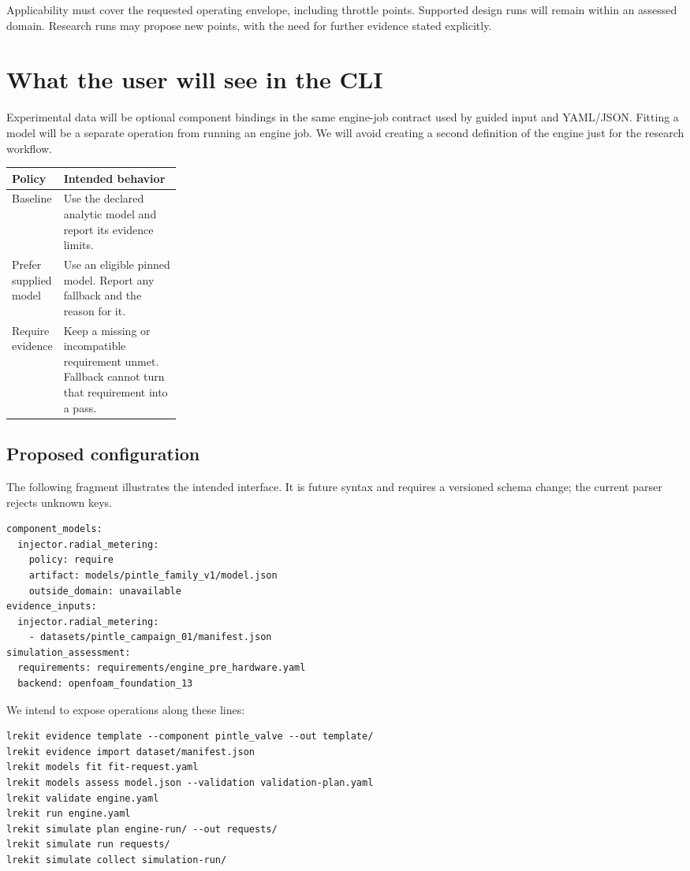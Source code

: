 Applicability must cover the requested operating envelope, including throttle points. Supported design runs will remain within an assessed domain. Research runs may propose new points, with the need for further evidence stated explicitly.

\section{What the user will see in the CLI}

Experimental data will be optional component bindings in the same engine-job contract used by guided input and YAML/JSON. Fitting a model will be a separate operation from running an engine job. We will avoid creating a second definition of the engine just for the research workflow.

\begin{tabularx}{\linewidth}{@{}P{0.25\linewidth}Y@{}}
\toprule
\textbf{Policy} & \textbf{Intended behavior}\\
\midrule
Baseline & Use the declared analytic model and report its evidence limits.\\
Prefer supplied model & Use an eligible pinned model. Report any fallback and the reason for it.\\
Require evidence & Keep a missing or incompatible requirement unmet. Fallback cannot turn that requirement into a pass.\\
\bottomrule
\end{tabularx}

\subsection{Proposed configuration}

The following fragment illustrates the intended interface. It is future syntax and requires a versioned schema change; the current parser rejects unknown keys.

\begin{lstlisting}
component_models:
  injector.radial_metering:
    policy: require
    artifact: models/pintle_family_v1/model.json
    outside_domain: unavailable
evidence_inputs:
  injector.radial_metering:
    - datasets/pintle_campaign_01/manifest.json
simulation_assessment:
  requirements: requirements/engine_pre_hardware.yaml
  backend: openfoam_foundation_13
\end{lstlisting}

We intend to expose operations along these lines:
\begin{lstlisting}
lrekit evidence template --component pintle_valve --out template/
lrekit evidence import dataset/manifest.json
lrekit models fit fit-request.yaml
lrekit models assess model.json --validation validation-plan.yaml
lrekit validate engine.yaml
lrekit run engine.yaml
lrekit simulate plan engine-run/ --out requests/
lrekit simulate run requests/
lrekit simulate collect simulation-run/
\end{lstlisting}

